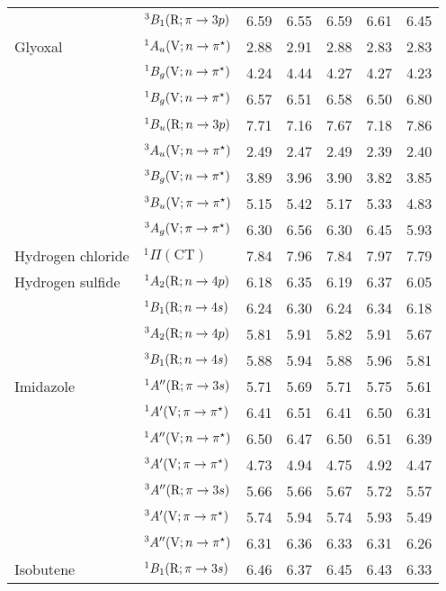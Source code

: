\begin{tabular}{p{3.5cm}p{3.3cm}c|cccc}
        &$^3B_1 (\mathrm{R}; \pi \rightarrow 3p)$				& 6.59    	&6.55	&6.59	&6.61	&6.45 \\	
  Glyoxal		&$^1A_u (\mathrm{V}; n \rightarrow \pi^\star)$					& 2.88	&2.91	&2.88	&2.83	&2.83 \\	
        &$^1B_g (\mathrm{V}; n \rightarrow \pi^\star)$					& 4.24	&4.44	&4.27	&4.27	&4.23 \\	
        &$^1B_g (\mathrm{V}; n \rightarrow \pi^\star)$					& 6.57 	&6.51	&6.58	&6.50	&6.80 \\	
        &$^1B_u (\mathrm{R}; n \rightarrow 3p)$					& 7.71	&7.16	&7.67	&7.18	&7.86 \\	
        &$^3A_u (\mathrm{V}; n \rightarrow \pi^\star)$					& 2.49	&2.47	&2.49	&2.39	&2.40 \\	
        &$^3B_g (\mathrm{V}; n \rightarrow \pi^\star)$					& 3.89	&3.96	&3.90	&3.82	&3.85 \\	
        &$^3B_u (\mathrm{V}; \pi \rightarrow \pi^\star)$				& 5.15	&5.42	&5.17	&5.33	&4.83 \\	
        &$^3A_g (\mathrm{V}; \pi \rightarrow \pi^\star)$				& 6.30	&6.56	&6.30	&6.45	&5.93 \\	
  Hydrogen chloride	 & $^1\Pi (\mathrm{CT})$				&7.84	&7.96	&7.84	&7.97	&7.79	\\
  Hydrogen sulfide &$^1A_2 (\mathrm{R};n \rightarrow 4p)$ 				&6.18	&6.35	&6.19	&6.37	&6.05	\\
        &$^1B_1 (\mathrm{R};n \rightarrow 4s)$ 					&6.24	&6.30	&6.24	&6.34	&6.18	\\
        &$^3A_2 (\mathrm{R};n \rightarrow 4p)$ 					&5.81	&5.91	&5.82	&5.91	&5.67	\\
        &$^3B_1 (\mathrm{R};n \rightarrow 4s)$ 					&5.88	&5.94	&5.88	&5.96	&5.81	\\
  Imidazole		&$^1A^{\prime\prime} (\mathrm{R}; \pi \rightarrow 3s)$					& 5.71 	&5.69	&5.71	&5.75	&5.61 \\	
        &$^1A^\prime (\mathrm{V}; \pi \rightarrow \pi^\star)$					& 6.41	&6.51	&6.41	&6.50	&6.31 \\	
        &$^1A^{\prime\prime} (\mathrm{V}; n \rightarrow \pi^\star)$					& 6.50	&6.47	&6.50	&6.51	&6.39 \\	
        &$^3A^\prime (\mathrm{V}; \pi \rightarrow \pi^\star)$					& 4.73	&4.94	&4.75	&4.92	&4.47 \\	
        &$^3A^{\prime\prime} (\mathrm{R}; \pi \rightarrow 3s)$					& 5.66	&5.66	&5.67	&5.72	&5.57 \\	
        &$^3A^\prime (\mathrm{V}; \pi \rightarrow \pi^\star)$					& 5.74	&5.94	&5.74	&5.93	&5.49 \\	
        &$^3A^{\prime\prime} (\mathrm{V}; n \rightarrow \pi^\star)$					& 6.31	&6.36	&6.33	&6.31	&6.26 \\	
  Isobutene		&$^1B_1 (\mathrm{R}; \pi \rightarrow 3s)$				& 6.46	&6.37	&6.45	&6.43	&6.33 \\	

\end{tabular}
